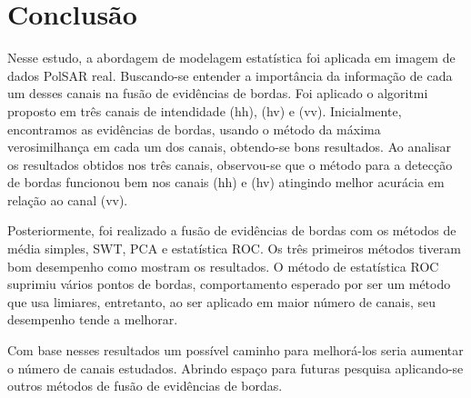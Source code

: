 \documentclass[conference]{IEEEtran}
\begin{document}

\section{Conclusão}\label{sec_08}
Nesse estudo, a abordagem de modelagem estatística foi aplicada em imagem de dados PolSAR real. Buscando-se entender a importância da informação de cada um desses canais na fusão de evidências de bordas. Foi aplicado o algoritmi proposto em três canais de intendidade (hh), (hv) e (vv). Inicialmente, encontramos as evidências de bordas, usando o método da máxima verosimilhança em cada um dos canais, obtendo-se bons resultados. Ao analisar os resultados obtidos nos três canais, observou-se que o método para a detecção de bordas funcionou bem nos canais (hh) e (hv) atingindo melhor acurácia em relação ao canal (vv).

Posteriormente, foi realizado a fusão de evidências de bordas com os métodos de média simples, SWT, PCA e estatística ROC. Os três primeiros métodos tiveram bom desempenho como mostram os resultados. O método de estatística ROC suprimiu vários pontos de bordas, comportamento esperado por ser um método que usa limiares, entretanto, ao ser aplicado em maior número de canais, seu desempenho tende a melhorar. 

Com base nesses resultados um possível caminho para melhorá-los seria aumentar o número de canais estudados. Abrindo espaço para futuras pesquisa aplicando-se outros métodos de fusão de evidências de bordas.



\end{document}
